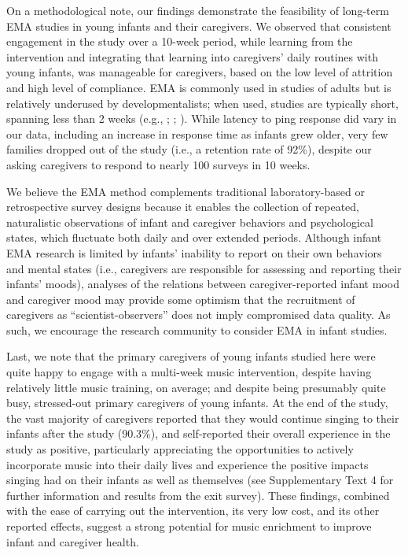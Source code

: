 \documentclass[
]{article}
\begin{document}
On a methodological note, our findings demonstrate the feasibility of
long-term EMA studies in young infants and their caregivers. We observed
that consistent engagement in the study over a 10-week period, while
learning from the intervention and integrating that learning into
caregivers' daily routines with young infants, was manageable for
caregivers, based on the low level of attrition and high level of
compliance. EMA is commonly used in studies of adults but is relatively
underused by developmentalists; when used, studies are typically short,
spanning less than 2 weeks (e.g., ; ;
). While latency to ping
response did vary in our data, including an increase in response time as
infants grew older, very few families dropped out of the study (i.e., a
retention rate of 92\%), despite our asking caregivers to respond to
nearly 100 surveys in 10 weeks.

We believe the EMA method complements traditional laboratory-based or
retrospective survey designs because it enables the collection of
repeated, naturalistic observations of infant and caregiver behaviors
and psychological states, which fluctuate both daily and over extended
periods. Although infant EMA research is limited by infants' inability
to report on their own behaviors and mental states (i.e., caregivers are
responsible for assessing and reporting their infants' moods), analyses
of the relations between caregiver-reported infant mood and caregiver
mood may provide some optimism that the recruitment of caregivers as
``scientist-observers'' does not imply compromised data quality. As
such, we encourage the research community to consider EMA in infant
studies.

Last, we note that the primary caregivers of young infants studied here
were quite happy to engage with a multi-week music intervention, despite
having relatively little music training, on average; and despite being
presumably quite busy, stressed-out primary caregivers of young infants.
At the end of the study, the vast majority of caregivers reported that
they would continue singing to their infants after the study (90.3\%),
and self-reported their overall experience in the study as positive,
particularly appreciating the opportunities to actively incorporate
music into their daily lives and experience the positive impacts singing
had on their infants as well as themselves (see Supplementary Text 4 for
further information and results from the exit survey). These findings,
combined with the ease of carrying out the intervention, its very low
cost, and its other reported effects, suggest a strong potential for
music enrichment to improve infant and caregiver health.
\end{document}

